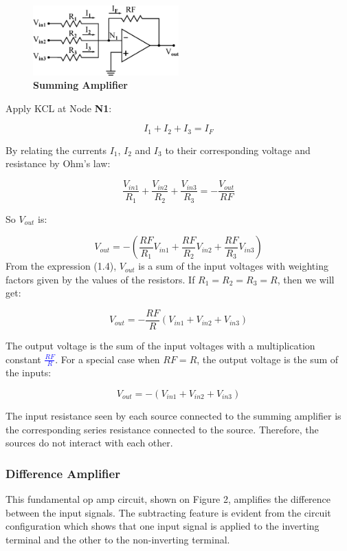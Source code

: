 \documentclass[a4 paper]{article}
\newcommand{\blue}[1]{\textcolor{blue}{#1}}
\numberwithin{equation}{section}
\newcommand{\0}{\mathbf{0}}
\begin{document}
\begin{figure}[!ht]
  \centering
  \includegraphics[width=0.5\textwidth]{./images/summingamp}
  \caption{{\bf Summing Amplifier}}
\end{figure}

Apply KCL at Node {\bf N1}:

\begin{equation}
I_1 + I_2 + I_3 = I_F
\end{equation}

By relating the currents $I_1$, $I_2$ and $I_3$ to their corresponding voltage and resistance by Ohm's law:

\begin{equation}
\frac{V_{in1}}{R_1} + \frac{V_{in2}}{R_2} + \frac{V_{in3}}{R_3} = -\frac{V_{out}}{RF}
\end{equation}

So $V_{out}$ is:

\begin{equation}
V_{out} = -(\frac{RF}{R_1}V_{in1}+\frac{RF}{R_2}V_{in2}+\frac{RF}{R_3}V_{in3})
\end{equation}
From the expression (1.4), $V_{out}$ is a sum of the input voltages with weighting factors given by the values of the resistors. If $R_1 = R_2 = R_3 = R$, then we will get:

\begin{equation}
V_{out} = -\frac{RF}{R}(V_{in1} + V_{in2} + V_{in3})
\end{equation}

The output voltage is the sum of the input voltages with a multiplication constant \blue{$\frac{RF}{R}$}. For a special case when $RF = R$, the output voltage is the sum of the inputs:

\begin{equation}
V_{out} = -(V_{in1} + V_{in2} + V_{in3})
\end{equation}


The input resistance seen by each source connected to the summing amplifier is the corresponding series resistance connected to the source. Therefore, the sources do not interact with each other.


\subsubsection{Difference Amplifier}
This fundamental op amp circuit, shown on Figure 2, amplifies the difference between the input signals. The subtracting feature is evident from the circuit configuration which shows that one input signal is applied to the inverting terminal and the other to the non-inverting terminal.
\end{document}
